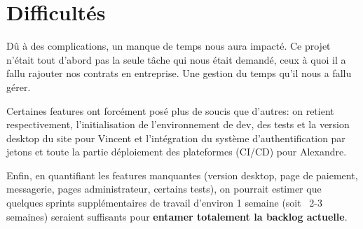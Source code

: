 \section{Difficultés}
\label{Difficultés}

Dû à des complications, un manque de temps nous aura impacté. Ce projet n'était tout d'abord pas la seule tâche qui nous était demandé, ceux à quoi il a fallu rajouter nos contrats en entreprise. Une gestion du temps qu'il nous a fallu gérer.

Certaines features ont forcément posé plus de soucis que d'autres: on retient respectivement, l'initialisation de l'environnement de dev, des tests et la version desktop du site pour Vincent et l'intégration du système d'authentification par jetons et toute la partie déploiement des plateformes (CI/CD) pour Alexandre.

Enfin, en quantifiant les features manquantes (version desktop, page de paiement, messagerie, pages administrateur, certains tests), on pourrait estimer que quelques sprints supplémentaires de travail d'environ 1 semaine (soit ~2-3 semaines) seraient suffisants pour \textbf{entamer totalement la backlog actuelle}.

